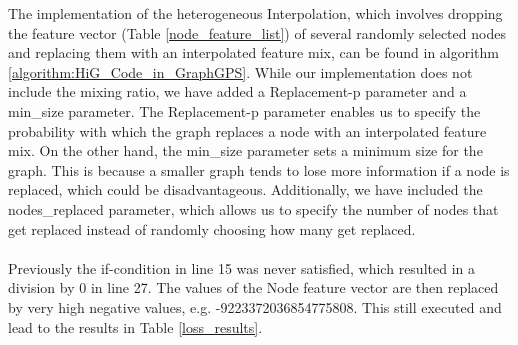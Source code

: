 The implementation of the heterogeneous Interpolation, which involves dropping the feature vector (Table \ref{node_feature_list}) of several randomly selected nodes and replacing them with an interpolated feature mix, can be found in algorithm \ref{algorithm:HiG_Code_in_GraphGPS}. While our implementation does not include the mixing ratio, we have added a Replacement-p parameter and a min\_size parameter. The Replacement-p parameter enables us to specify the probability with which the graph replaces a node with an interpolated feature mix. On the other hand, the min\_size parameter sets a minimum size for the graph. This is because a smaller graph tends to lose more information if a node is replaced, which could be disadvantageous. Additionally, we have included the nodes\_replaced parameter, which allows us to specify the number of nodes that get replaced instead of randomly choosing how many get replaced. \\\\

Previously the if-condition in line 15 was never satisfied, which resulted in a division by 0 in line 27. The values of the Node feature vector are then replaced by very high negative values, e.g. -9223372036854775808. This still executed and lead to the results in Table \ref{loss_results}. 

